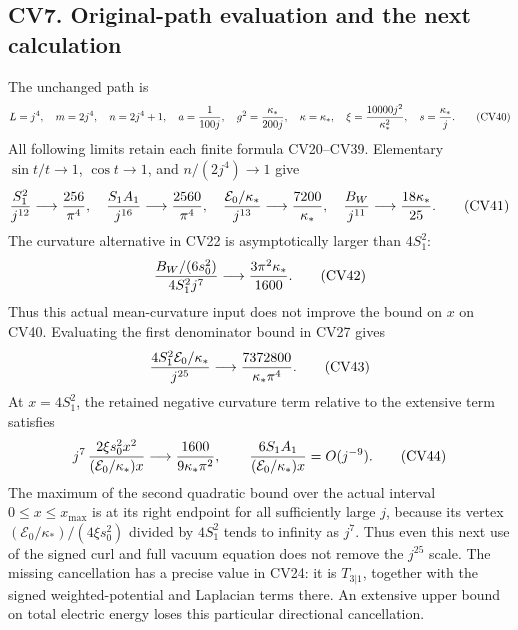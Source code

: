 \documentclass[11pt]{article}
\begin{document}
\subsection*{CV7. Original-path evaluation and the next calculation}

The unchanged path is
\[
 L=j^4,\quad m=2j^4,\quad n=2j^4+1,\quad a={1\over100j},
 \quad g^2={\kappa_*\over200j},\quad\kappa=\kappa_*,
 \quad\xi={10000j^2\over\kappa_*^2},\quad s={\kappa_*\over j}.
                                                               \tag{CV40}
\]
All following limits retain each finite formula CV20–CV39. Elementary
\(\sin t/t\to1\), \(\cos t\to1\), and \(n/(2j^4)\to1\) give
\[
 {S_1^2\over j^{12}}\longrightarrow {256\over\pi^4},\quad
 {S_1A_1\over j^{16}}\longrightarrow {2560\over\pi^4},\quad
 {\mathcal E_0/\kappa_*\over j^{13}}\longrightarrow{7200\over\kappa_*},
 \quad {B_W\over j^{11}}\longrightarrow {18\kappa_*\over25}.
                                                               \tag{CV41}
\]
The curvature alternative in CV22 is asymptotically larger than
\(4S_1^2\):
\[
 {B_W/(6s_0^2)\over4S_1^2j^7}
          \longrightarrow {3\pi^2\kappa_*\over1600}.
                                                               \tag{CV42}
\]
Thus this actual mean-curvature input does not improve the bound on
\(x\) on CV40. Evaluating the first denominator bound in CV27 gives
\[
 {4S_1^2\mathcal E_0/\kappa_*\over j^{25}}
       \longrightarrow{7372800\over\kappa_*\pi^4}.       \tag{CV43}
\]
At \(x=4S_1^2\), the retained negative curvature term relative to the
extensive term satisfies
\[
 j^7\,{2\xi s_0^2x^2\over (\mathcal E_0/\kappa_*)x}
       \longrightarrow {1600\over9\kappa_*\pi^2},
 \qquad {6S_1A_1\over(\mathcal E_0/\kappa_*)x}
                         =O(j^{-9}).                   \tag{CV44}
\]
The maximum of the second quadratic bound over the actual interval
\(0\le x\le x_{\max}\) is at its right endpoint for all sufficiently
large \(j\), because its vertex
\((\mathcal E_0/\kappa_*)/(4\xi s_0^2)\) divided by \(4S_1^2\)
tends to infinity as \(j^7\). Thus even this next use of the signed
curl and full vacuum equation does not remove the \(j^{25}\) scale.
The missing cancellation has a precise value in CV24: it is
\(T_{3|1}\), together with the signed weighted-potential and Laplacian
terms there. An extensive upper bound on total electric energy loses
this particular directional cancellation.
\end{document}
